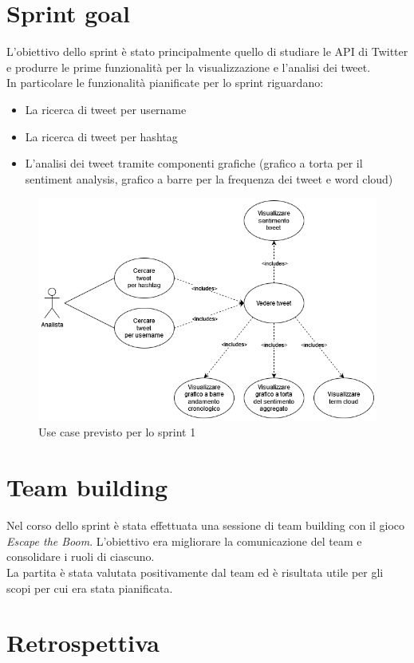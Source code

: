 \documentclass[11pt]{article}
\begin{document}
\section*{Sprint goal}
\justify
L'obiettivo dello sprint è stato principalmente quello di studiare le API di Twitter e produrre le prime funzionalità per la visualizzazione e l'analisi dei tweet.\\
In particolare le funzionalità pianificate per lo sprint riguardano:
\begin{itemize}
    \item La ricerca di tweet per username
    \item La ricerca di tweet per hashtag
    \item L'analisi dei tweet tramite componenti grafiche (grafico a torta per il sentiment analysis, grafico a barre per la frequenza dei tweet e word cloud)
\end{itemize}
\begin{figure}[H]
    \centering
    \includegraphics[width=12cm]{./img/usecase.png}
    \caption{Use case previsto per lo sprint 1}
\end{figure}


\newpage
\section*{Team building}
Nel corso dello sprint è stata effettuata una sessione di team building con il gioco \textit{Escape the Boom}.
L'obiettivo era migliorare la comunicazione del team e consolidare i ruoli di ciascuno.\\
La partita è stata valutata positivamente dal team ed è risultata utile per gli scopi per cui era stata pianificata.


\section*{Retrospettiva}
\end{document}
